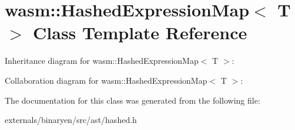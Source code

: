 \hypertarget{classwasm_1_1_hashed_expression_map}{}\section{wasm\+:\+:Hashed\+Expression\+Map$<$ T $>$ Class Template Reference}
\label{classwasm_1_1_hashed_expression_map}


Inheritance diagram for wasm\+:\+:Hashed\+Expression\+Map$<$ T $>$\+:


Collaboration diagram for wasm\+:\+:Hashed\+Expression\+Map$<$ T $>$\+:


The documentation for this class was generated from the following file\+:\begin{DoxyCompactItemize}
\item 
externals/binaryen/src/ast/hashed.\+h\end{DoxyCompactItemize}
